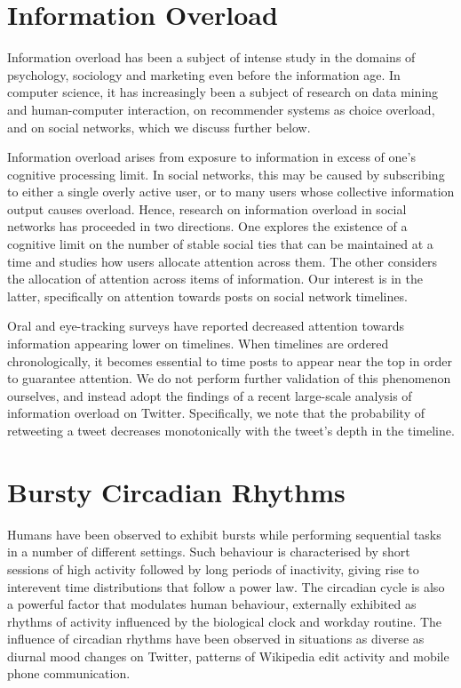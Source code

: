 \documentclass[onesided,letterpaper]{tufte-book}
\begin{document}
\newpage
\section{Information Overload}

Information overload has been a subject of intense study in the domains of psychology, sociology and marketing even before the information age\cite{eppler2004concept}. In computer science, it has increasingly been a subject of research on data mining and human-computer interaction\cite{Shahaf:2010:CDN:1835804.1835884}, on recommender systems as choice overload\cite{Bollen:2010:UCO:1864708.1864724}, and on social networks, which we discuss further below.

Information overload arises from exposure to information in excess of one's cognitive processing limit. In social networks, this may be caused by subscribing to either a single overly active user, or to many users whose collective information output causes overload. Hence, research on information overload in social networks has proceeded in two directions. One explores the existence of a cognitive limit on the number of stable social ties that can be maintained at a time and studies how users allocate attention across them\cite{backstrom2011center}\cite{gonccalves2011modeling}. The other considers the allocation of attention across items of information. Our interest is in the latter, specifically on attention towards posts on social network timelines.

Oral and eye-tracking surveys\cite{counts2011taking} have reported decreased attention towards information appearing lower on timelines. When timelines are ordered chronologically, it becomes essential to time posts to appear near the top in order to guarantee attention. We do not perform further validation of this phenomenon ourselves, and instead adopt the findings of a recent large-scale analysis of information overload on Twitter\cite{gomez2014quantifying}. Specifically, we note that the  probability of retweeting a tweet decreases monotonically with the tweet's depth in the timeline.

\section{Bursty Circadian Rhythms}
\label{ch:bursty-circadian}

Humans have been observed to exhibit bursts while performing sequential tasks in a number of different settings. Such behaviour is characterised by short sessions of high activity followed by long periods of inactivity, giving rise to interevent time distributions that follow a power law. The circadian cycle is also a powerful factor that modulates human behaviour, externally exhibited as rhythms of activity influenced by the biological clock and workday routine. The influence of circadian rhythms have been observed in situations as diverse as diurnal mood changes on Twitter\cite{golder2011diurnal}, patterns of Wikipedia edit activity\cite{yasseri2012circadian} and mobile phone communication\cite{jo2012circadian}.
\end{document}
